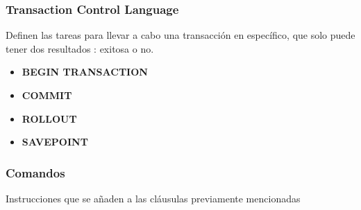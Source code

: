 \subsubsection{Transaction Control Language}
Definen las tareas para llevar a cabo una transacción en específico, que solo puede tener dos resultados : exitosa o no. 
\begin{itemize}
    \item {\textbf{BEGIN TRANSACTION}}
    \item {\textbf{COMMIT}}
    \item {\textbf{ROLLOUT}}
    \item {\textbf{SAVEPOINT}}
\end{itemize}

\subsubsection{Comandos}
Instrucciones que se añaden a las cláusulas previamente mencionadas
